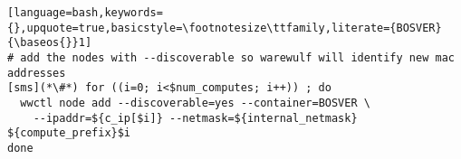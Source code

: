 \begin{lstlisting}[language=bash,keywords={},upquote=true,basicstyle=\footnotesize\ttfamily,literate={BOSVER}{\baseos{}}1]
# add the nodes with --discoverable so warewulf will identify new mac addresses
[sms](*\#*) for ((i=0; i<$num_computes; i++)) ; do
  wwctl node add --discoverable=yes --container=BOSVER \
    --ipaddr=${c_ip[$i]} --netmask=${internal_netmask} ${compute_prefix}$i
done
\end{lstlisting}

